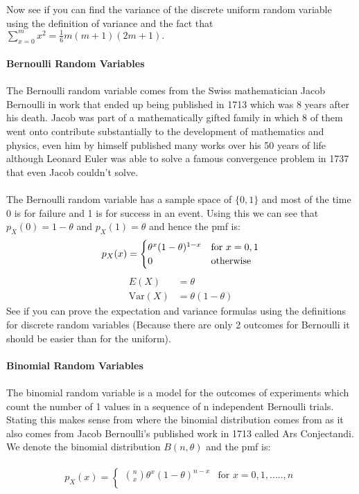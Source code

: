 \documentclass[,oneside]{article}
\begin{document}
\begin{enumerate}
Now see if you can find the variance of the discrete uniform random variable using the definition of variance and the fact that $\sum\limits_{x=0}^{m} x^2 = \frac{1}{6}m(m+1)(2m+1).$\\ \\
\textbf{Bernoulli Random Variables}\\ \\
The Bernoulli random variable comes from the Swiss mathematician Jacob Bernoulli in work that ended up being published in 1713 which was 8 years after his death. Jacob was part of a mathematically gifted family in which 8 of them went onto contribute substantially to the development of mathematics and physics, even him by himself published many works over his 50 years of life although Leonard Euler was able to solve a famous convergence problem in 1737 that even Jacob couldn't solve.\\ \\
The Bernoulli random variable has a sample space of $\{0,1\}$ and most of the time 0 is for failure and 1 is for success in an event. Using this we can see that $p_X(0)=1-\theta$ and $p_X(1)=\theta$ and hence the pmf is:\\
\[
p_X(x)=
\begin{cases}
\theta^{x}(1-\theta)^{1-x} & \text{for }  x = 0, 1 \\
0 & $otherwise$
\end{cases} \] 
\begin{align*}
E(X)&=\theta\\
\text{Var}(X)&=\theta (1-\theta)
\end{align*}
See if you can prove the expectation and variance formulas using the definitions for discrete random variables (Because there are only 2 outcomes for Bernoulli it should be easier than for the uniform).\\ \\
\textbf{Binomial Random Variables} \\ \\
The binomial random variable is a model for the outcomes of experiments which count the number of 1 values in a sequence of n independent Bernoulli trials. Stating this makes sense from where the binomial distribution comes from as it also comes from Jacob Bernoulli's published work in 1713 called Ars Conjectandi. We denote the binomial distribution $B(n,\theta)$ and the pmf is:\\ \\
\[
p_X(x)=
\begin{cases}
\binom{n}{x} \theta^{x} (1-\theta)^{n-x} & \text{for }  x = 0, 1,....., n \\

\end{cases}\]
\end{enumerate}
\end{document}
